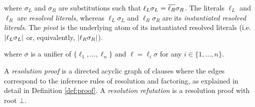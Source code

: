 \begin{definition}[Resolution] \label{def:fores} \hfill
\begin{prooftree}
\end{prooftree}
where $\sigma_L$ and $\sigma_R$ are substitutions such that $\ell_L\sigma_L=\dual{\ell_R}\sigma_R$. The literals $\ell_L$ and $\ell_R$ are \emph{resolved literals}, whereas $\ell_L \sigma_L$ and $\ell_R \sigma_R$ are its \emph{instantiated resolved literals}. The \emph{pivot} is the underlying atom of its instantiated resolved literals (i.e. $\abs{\ell_L \sigma_L}$ or, equivalently, $\abs{\ell_R \sigma_R}$).
\end{definition}

\begin{definition}[Factoring] \label{def:fofact} \hfill
\begin{prooftree}
\end{prooftree}
where $\sigma$ is a unifier of $\{\ell_1,\ldots,\ell_n\}$ and $\ell=\ell_i\sigma$ for any $i\in \{1,\ldots,n\}$.
\end{definition}

A \emph{resolution proof} is a directed acyclic graph of clauses where the edges correspond to the inference rules of resolution and factoring, as explained in detail in Definition \ref{def:proof}. A \emph{resolution refutation} is a resolution proof with root $\bot$.


